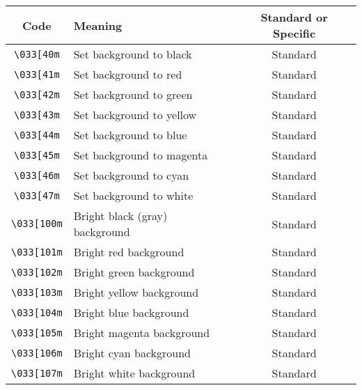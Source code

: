 
\begin{NxLightBox}[title={ANSI Background Color Codes}]
    \begin{tabularx}{\textwidth}{|c|X|c|}
        \hline
        \textbf{Code} & \textbf{Meaning} & \textbf{Standard or Specific} \\
        \hline
        \texttt{\textbackslash033[40m} & Set background to black & Standard \\
        \texttt{\textbackslash033[41m} & Set background to red & Standard \\
        \texttt{\textbackslash033[42m} & Set background to green & Standard \\
        \texttt{\textbackslash033[43m} & Set background to yellow & Standard \\
        \texttt{\textbackslash033[44m} & Set background to blue & Standard \\
        \texttt{\textbackslash033[45m} & Set background to magenta & Standard \\
        \texttt{\textbackslash033[46m} & Set background to cyan & Standard \\
        \texttt{\textbackslash033[47m} & Set background to white & Standard \\
        \texttt{\textbackslash033[100m} & Bright black (gray) background & Standard \\
        \texttt{\textbackslash033[101m} & Bright red background & Standard \\
        \texttt{\textbackslash033[102m} & Bright green background & Standard \\
        \texttt{\textbackslash033[103m} & Bright yellow background & Standard \\
        \texttt{\textbackslash033[104m} & Bright blue background & Standard \\
        \texttt{\textbackslash033[105m} & Bright magenta background & Standard \\
        \texttt{\textbackslash033[106m} & Bright cyan background & Standard \\
        \texttt{\textbackslash033[107m} & Bright white background & Standard \\
    \hline
    \end{tabularx}
\end{NxLightBox}

